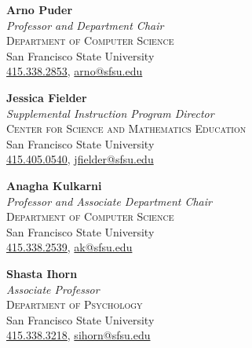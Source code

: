 \documentclass[hidelinks, 10pt]{article}
\begin{document}
{\begin{minipage}[ct]{0.9\linewidth}
\begin{multicols*}{2}
        \vspace{-1mm}

        \textbf{Arno Puder}\\
        \emph{Professor and Department Chair}\\
        \textsc{Department of Computer Science}\\
        San Francisco State University\\
        \href{tel:4153382853}{415.338.2853}, \href{mailto:arno@sfsu.edu}{arno@sfsu.edu}\\

        \vspace{-1mm}

        \textbf{Jessica Fielder}\\
        \emph{Supplemental Instruction Program Director}\\
        \textsc{Center for Science and Mathematics Education}\\
        San Francisco State University\\
        \href{tel:4154050540}{415.405.0540}, \href{mailto:jfielder@sfsu.edu}{jfielder@sfsu.edu}\\

        \columnbreak

        \textbf{Anagha Kulkarni}\\
        \emph{Professor and Associate Department Chair}\\
        \textsc{Department of Computer Science}\\
        San Francisco State University\\
        \href{tel:4153382539}{415.338.2539}, \href{mailto:ak@sfsu.edu}{ak@sfsu.edu}\\

        \vspace{-1mm}

        \textbf{Shasta Ihorn}\\
        \emph{Associate Professor}\\
        \textsc{Department of Psychology}\\
        San Francisco State University\\
        \href{tel:4153383218}{415.338.3218}, \href{mailto:sihorn@sfsu.edu}{sihorn@sfsu.edu}\\
    \end{multicols*}

\end{minipage}

}
\end{document}
